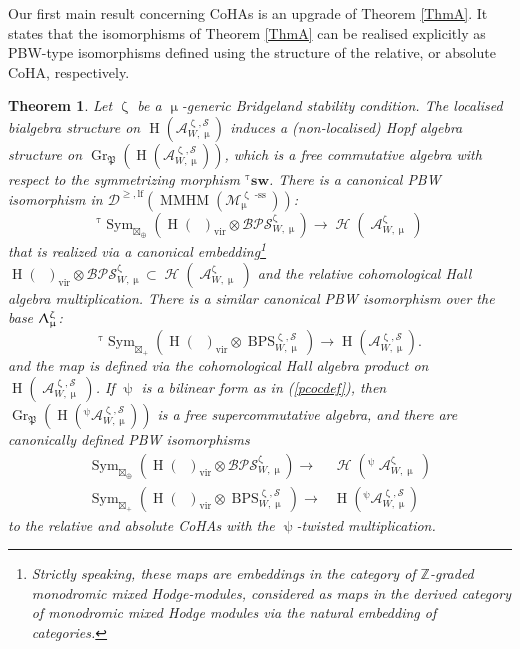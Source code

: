 \documentclass[a4paper,10pt]{amsart}
\renewcommand{\zeta}{\upzeta}
\renewcommand{\Lambda}{\Uplambda}
\renewcommand{\psi}{\uppsi}
\renewcommand{\tau}{\uptau}
\renewcommand{\mu}{\upmu}
\newtheorem{thmx}{Theorem}
\DeclareMathOperator{\BC}{B\mathbb{C}^*}
\DeclareMathOperator{\Pf}{\mathfrak{P}}
\newcommand{\SP}{\mathcal{S}}
\newcommand{\Msp}{\mathcal{M}}
\newcommand{\DTS}{\mathcal{BPS}}
\DeclareMathOperator{\sst}{-ss}
\DeclareMathOperator{\FreeComm}{Sym}
\DeclareMathOperator{\MMHM}{MMHM}
\DeclareMathOperator{\Gr}{Gr}
\DeclareMathOperator{\DT}{BPS}
\DeclareMathOperator{\Sym}{Sym}
\DeclareMathOperator{\vir}{vir}
\DeclareMathOperator{\Ho}{\mathcal{H}}
\DeclareMathOperator{\HO}{H}
\DeclareMathOperator{\Coha}{\mathcal{A}}
\newcommand{\Dulf}{\mathcal{D}^{\geq, \mathrm{lf}}}
\begin{document}

\smallbreak
Our first main result concerning CoHAs is an upgrade of Theorem \ref{ThmA}.  It states that the isomorphisms of Theorem \ref{ThmA} can be realised explicitly as PBW-type isomorphisms defined using the structure of the relative, or absolute CoHA, respectively. 
\begin{thmx}\label{qea}
Let $\zeta$ be a $\mu$-generic Bridgeland stability condition.  The localised bialgebra structure on $\HO(\mathcal{A}^{\zeta,\SP}_{W,\mu})$ induces a (non-localised) Hopf algebra structure on $\Gr_{\Pf}(\HO(\mathcal{A}_{W,\mu}^{\zeta,\SP}))$, which is a free commutative algebra with respect to the symmetrizing morphism ${}^{\tau}\!\textbf{sw}$.  There is a canonical PBW isomorphism in $\Dulf(\MMHM(\Msp_{\mu}^{\zeta\sst}))$:
\begin{equation}
\label{PBWiso1}
{}^{\tau}\!\FreeComm_{\boxtimes_{\oplus}}\left(\HO(\BC)_{\vir}\otimes\DTS_{W,\mu}^{\zeta}\right)\rightarrow \Ho(\Coha_{W,\mu}^{\zeta})
\end{equation}
that is realized via a canonical embedding\footnote{Strictly speaking, these maps are embeddings in the category of $\mathbb{Z}$-graded monodromic mixed Hodge-modules, considered as maps in the derived category of monodromic mixed Hodge modules via the natural embedding of categories.} $\HO(\BC)_{\vir}\otimes\DTS_{W,\mu}^{\zeta}\subset \Ho(\Coha_{W,\mu}^{\zeta})$ and the relative cohomological Hall algebra multiplication.  There is a similar canonical PBW isomorphism over the base $\Lambda^{\zeta}_{\mu}$:
\begin{equation}
\label{PBWiso2}
{}^{\tau}\!\Sym_{\boxtimes_+}\left(\HO(\BC)_{\vir}\otimes \DT_{W,\mu}^{\zeta,\SP}\right)\rightarrow\HO(\mathcal{A}_{W,\mu}^{\zeta,\SP}).
\end{equation}
and the map is defined via the cohomological Hall algebra product on $\HO(\Coha_{W,\mu}^{\zeta,\SP})$.  
If $\psi$ is a bilinear form as in (\ref{pcocdef}), then $\Gr_{\Pf}(\HO(^{\psi}\!\!\mathcal{A}_{W,\mu}^{\zeta,\SP}))$ is a free supercommutative algebra, and there are canonically defined PBW isomorphisms
\begin{align}
\label{PBWiso3}
\FreeComm_{\boxtimes_{\oplus}}\left(\HO(\BC)_{\vir}\otimes \DTS_{W,\mu}^{\zeta}\right)\rightarrow &\Ho(^{\psi}\!\!\Coha_{W,\mu}^{\zeta})\\
\label{PBWiso4}
\Sym_{\boxtimes_+}\left(\HO(\BC)_{\vir}\otimes\DT_{W,\mu}^{\zeta,\SP}\right)\rightarrow&\HO(^{\psi}\!\!\mathcal{A}_{W,\mu}^{\zeta,\SP})
\end{align}
to the relative and absolute CoHAs with the $\psi$-twisted multiplication.
\end{thmx}
\end{document}
